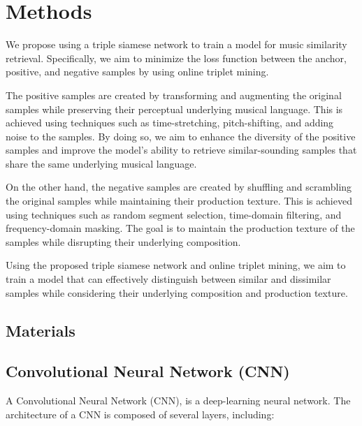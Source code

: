 \chapter{Methods}

We propose using a triple siamese network to train a model for music similarity retrieval. Specifically, we aim to minimize the loss function between the anchor, positive, and negative samples by using online triplet mining.

The positive samples are created by transforming and augmenting the original samples while preserving their perceptual underlying musical language. This is achieved using techniques such as time-stretching, pitch-shifting, and adding noise to the samples. By doing so, we aim to enhance the diversity of the positive samples and improve the model's ability to retrieve similar-sounding samples that share the same underlying musical language.

On the other hand, the negative samples are created by shuffling and scrambling the original samples while maintaining their production texture. This is achieved using techniques such as random segment selection, time-domain filtering, and frequency-domain masking. The goal is to maintain the production texture of the samples while disrupting their underlying composition.

Using the proposed triple siamese network and online triplet mining, we aim to train a model that can effectively distinguish between similar and dissimilar samples while considering their underlying composition and production texture.

\section{Materials}

\section{Convolutional Neural Network (CNN)}

A Convolutional Neural Network (CNN), is a deep-learning neural network. The architecture of a CNN is composed of several layers, including:

